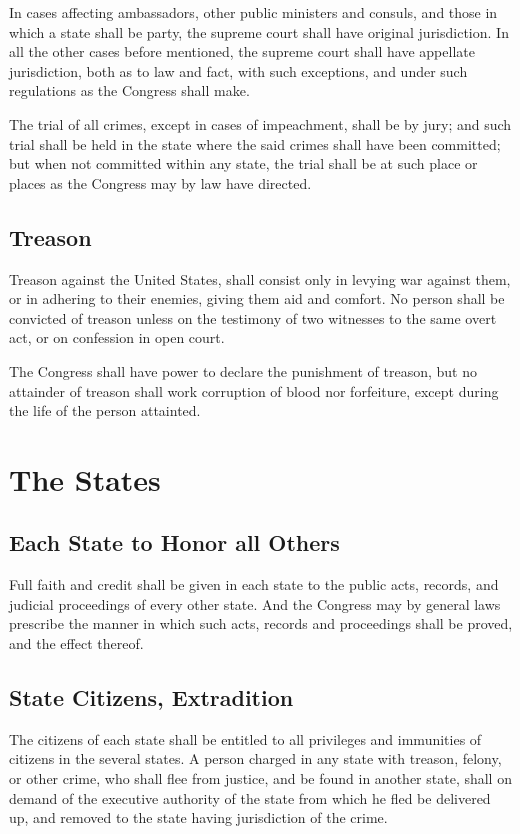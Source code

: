 \documentclass{constitution}
\begin{document}
In cases affecting ambassadors, other public ministers and consuls, and those in which a state shall be party,
the supreme court shall have original jurisdiction.
In all the other cases before mentioned,
the supreme court shall have appellate jurisdiction, both as to law and fact,
with such exceptions, and under such regulations as the Congress shall make.

The trial of all crimes, except in cases of impeachment, shall be by jury;
and such trial shall be held in the state where the said crimes shall have been committed;
but when not committed within any state, the trial shall be at such place or places as the Congress may by law have directed.

\section{Treason}
Treason against the United States, shall consist only in levying war against them,
or in adhering to their enemies, giving them aid and comfort.
No person shall be convicted of treason unless on the testimony of two witnesses to the same overt act,
or on confession in open court.

The Congress shall have power to declare the punishment of treason,
but no attainder of treason shall work corruption of blood nor forfeiture,
except during the life of the person attainted.

\chapter{The States}
\section{Each State to Honor all Others}
Full faith and credit shall be given in each state to the public acts, records, and judicial proceedings of every other state.
And the Congress may by general laws prescribe the manner in which such acts, records and proceedings shall be proved, and the effect thereof.

\section{State Citizens, Extradition}
The citizens of each state shall be entitled to all privileges and immunities of citizens in the several states.
A person charged in any state with treason, felony, or other crime, who shall flee from justice, and be found in another state, shall on demand of the executive authority of the state from which he fled be delivered up, and removed to the state having jurisdiction of the crime.
\end{document}

